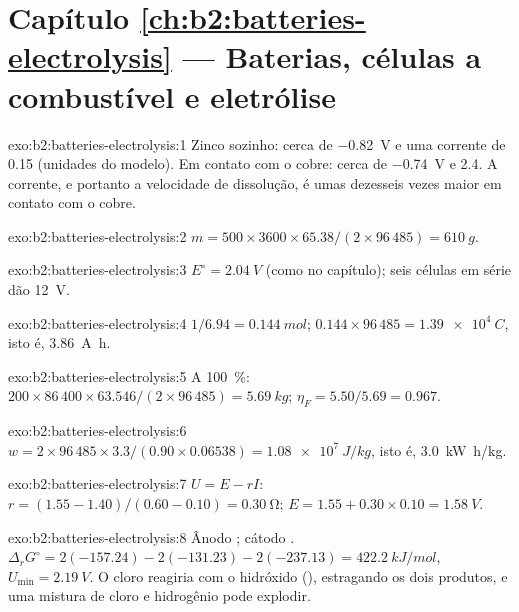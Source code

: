 \section*{Capítulo \ref{ch:b2:batteries-electrolysis} --- Baterias, células a combustível e eletrólise}

\begin{solution}{exo:b2:batteries-electrolysis:1}
Zinco sozinho: cerca de \qty{-0.82}{V} e uma corrente de 0.15 (unidades do
modelo). Em contato com o cobre: cerca de \qty{-0.74}{V} e 2.4. A corrente, e
portanto a velocidade de dissolução, é umas dezesseis vezes maior em contato
com o cobre.
\end{solution}

\begin{solution}{exo:b2:batteries-electrolysis:2}
$m = 500 \times 3600 \times 65.38/(2 \times 96\,485) = \qty{610}{g}$.
\end{solution}

\begin{solution}{exo:b2:batteries-electrolysis:3}
$E^\circ = \qty{2.04}{V}$ (como no capítulo); seis células em série dão
\qty{12}{V}.
\end{solution}

\begin{solution}{exo:b2:batteries-electrolysis:4}
$1/6.94 = \qty{0.144}{mol}$; $0.144 \times 96\,485 = \qty{1.39e4}{C}$, isto é,
\qty{3.86}{A.h}.
\end{solution}

\begin{solution}{exo:b2:batteries-electrolysis:5}
A 100~\%: $200 \times 86\,400 \times 63.546/(2 \times 96\,485) = \qty{5.69}{kg}$;
$\eta_F = 5.50/5.69 = 0.967$.
\end{solution}

\begin{solution}{exo:b2:batteries-electrolysis:6}
$w = 2 \times 96\,485 \times 3.3/(0.90 \times 0.06538) = \qty{1.08e7}{J/kg}$, isto é,
\qty{3.0}{kW.h/kg}.
\end{solution}

\begin{solution}{exo:b2:batteries-electrolysis:7}
$U = E - rI$: $r = (1.55 - 1.40)/(0.60 - 0.10) = \qty{0.30}{\ohm}$; $E = 1.55 + 0.30
\times 0.10 = \qty{1.58}{V}$.
\end{solution}

\begin{solution}{exo:b2:batteries-electrolysis:8}
Ânodo ; cátodo . $\Delta_r G^\circ =
2(-157.24) - 2(-131.23) - 2(-237.13) = \qty{422.2}{kJ/mol}$, $U_{\min} =
\qty{2.19}{V}$. O cloro reagiria com o hidróxido (), estragando os dois produtos, e uma mistura de cloro e
hidrogênio pode explodir.
\end{solution}

